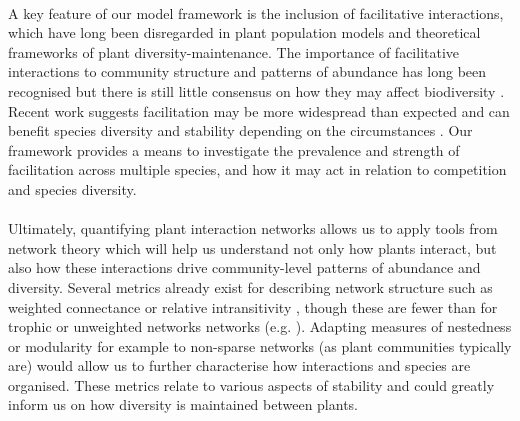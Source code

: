 \documentclass[a4,12pt]{article}
\begin{document}
        \paragraph{}
        A key feature of our model framework is the inclusion of facilitative interactions, which have long been disregarded in plant population models and theoretical frameworks of plant diversity-maintenance. The importance of facilitative interactions to community structure and patterns of abundance has long been recognised \parencite{Callaway1997a} but there is still little consensus on how they may affect biodiversity \parencite{Bruno2003}. Recent work suggests facilitation may be more widespread than expected \parencite{Gross2015, Picoche2020} and can  benefit species diversity and stability depending on the circumstances \parencite{Coyte2015, Brooker2008}. Our framework provides a means to investigate the prevalence and strength of facilitation across multiple species, and how it may act in relation to competition and species diversity.  
        
        \paragraph{}
        Ultimately, quantifying plant interaction networks allows us to apply tools from network theory which will help us understand not only how plants interact, but also how these interactions drive community-level patterns of abundance and diversity. Several metrics already exist for describing network structure such as weighted connectance \parencite{Ulanowicz1991} or relative intransitivity \parencite{Laird2006a}, though these are fewer than for trophic or unweighted networks networks (e.g. \cite{Bersier2002, Delmas2019}). Adapting measures of nestedness or modularity for example to non-sparse networks (as plant communities typically are) would allow us to further characterise how interactions and species are organised. These metrics relate to various aspects of stability and could greatly inform us on how diversity is maintained between plants. 

\end{document}
